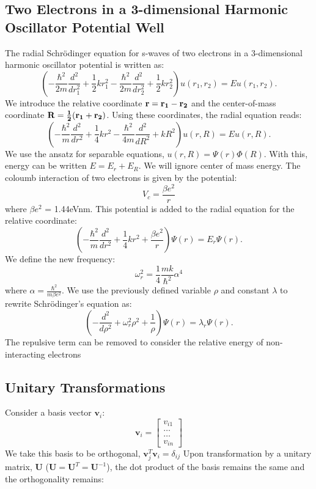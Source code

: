 \documentclass[10pt,showpacs,preprintnumbers,amsmath,amssymb,aps,prl,twocolumn,groupedaddress,superscriptaddress,showkeys]{revtex4-1}
\begin{document}
\subsection{Two Electrons in a 3-dimensional Harmonic Oscillator Potential Well}
The radial Schr\"{o}dinger equation for s-waves of two electrons in a 3-dimensional harmonic oscillator potential is written as:
\begin{equation}
 \left(-\frac{\hbar^2}{2 m}  \frac{d^2}{dr^2_1}
     + \frac{1}{2}kr^2_1-\frac{\hbar^2}{2 m} \frac{d^2}{dr^2_2}
          + \frac{1}{2}kr^2_2\right) u(r_1,r_2) = E u(r_1,r_2).
\end{equation}
We introduce the relative coordinate $\bf{r} = \bf{r}_1-\bf{r}_2$ and the center-of-mass coordinate $\bf{R} = \frac{1}{2}(\bf{r}_1+\bf{r}_2)$. Using these coordinates, the radial equation reads:
\begin{equation}
 \left(-\frac{\hbar^2}{m}  \frac{d^2}{dr^2}
     + \frac{1}{4}kr^2-\frac{\hbar^2}{4 m} \frac{d^2}{dR^2}
          + kR^2\right) u(r,R) = E u(r,R).
\end{equation}
We use the ansatz for separable equations, $u(r,R) = \Psi(r)\Phi(R)$. With this, energy can be written $E = E_r + E_R$. We will ignore center of mass energy. The coloumb interaction of two electrons is given by the potential:
\begin{equation}
V_c = \frac{\beta e^2}{r}
\end{equation}
where $\beta e^2$ = 1.44eVnm. This potential is added to the radial equation for the relative coordinate:
\begin{equation}
 \left(-\frac{\hbar^2}{m}  \frac{d^2}{dr^2}
     + \frac{1}{4}kr^2+\frac{\beta e^2}{r}\right) \Psi(r) = E_r \Psi(r).
\end{equation}
We define the new frequency:
\begin{equation}
\omega_r^2 = \frac{1}{4}\frac{mk}{\hbar^2}\alpha^4
\end{equation}
where $\alpha = \frac{\hbar^2}{m\beta e^2}$. We use the previously defined variable $\rho$ and constant $\lambda$ to rewrite Schr\"{o}dinger's equation as:
\begin{equation}
 \left(-\frac{d^2}{d\rho^2}
     + \omega_r^2\rho^2+\frac{1}{\rho}\right) \Psi(r) = \lambda_r \Psi(r).
\end{equation}
The repulsive term can be removed to consider the relative energy of non-interacting electrons

\subsection{Unitary Transformations}
Consider a basis vector $\mathbf{v}_{i}$:
   \[
	\mathbf{v}_i = \begin{bmatrix} v_{i1} \\ \dots \\ \dots \\v_{in} \end{bmatrix}
	\]
We take this basis to be orthogonal, $\mathbf{v}^{T}_{j} \mathbf{v}_{i} = \delta_{ij}$
Upon transformation by a unitary matrix, $\mathbf{U}$ ($\mathbf{U} = \mathbf{U}^T = \mathbf{U}^{-1}$), the dot product of the basis remains the same and the orthogonality remains:
\end{document}
